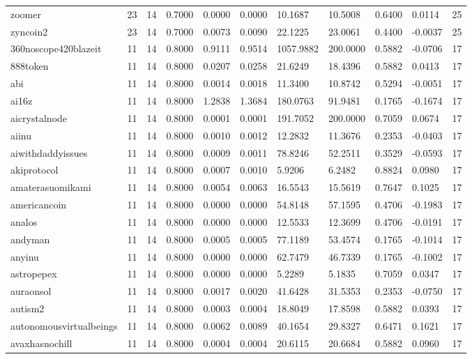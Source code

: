 \begin{table}[htbp]
\begin{tabular}{lllllllllll}
zoomer & 23 & 14 & 0.7000 & 0.0000 & 0.0000 & 10.1687 & 10.5008 & 0.6400 & 0.0114 & 25 \\
zyncoin2 & 23 & 14 & 0.7000 & 0.0073 & 0.0090 & 22.1225 & 23.0061 & 0.4400 & -0.0037 & 25 \\
360noscope420blazeit & 11 & 14 & 0.8000 & 0.9111 & 0.9514 & 1057.9882 & 200.0000 & 0.5882 & -0.0706 & 17 \\
888token & 11 & 14 & 0.8000 & 0.0207 & 0.0258 & 21.6249 & 18.4396 & 0.5882 & 0.0413 & 17 \\
abi & 11 & 14 & 0.8000 & 0.0014 & 0.0018 & 11.3400 & 10.8742 & 0.5294 & -0.0051 & 17 \\
ai16z & 11 & 14 & 0.8000 & 1.2838 & 1.3684 & 180.0763 & 91.9481 & 0.1765 & -0.1674 & 17 \\
aicrystalnode & 11 & 14 & 0.8000 & 0.0001 & 0.0001 & 191.7052 & 200.0000 & 0.7059 & 0.0674 & 17 \\
aiinu & 11 & 14 & 0.8000 & 0.0010 & 0.0012 & 12.2832 & 11.3676 & 0.2353 & -0.0403 & 17 \\
aiwithdaddyissues & 11 & 14 & 0.8000 & 0.0009 & 0.0011 & 78.8246 & 52.2511 & 0.3529 & -0.0593 & 17 \\
akiprotocol & 11 & 14 & 0.8000 & 0.0007 & 0.0010 & 5.9206 & 6.2482 & 0.8824 & 0.0980 & 17 \\
amaterasuomikami & 11 & 14 & 0.8000 & 0.0054 & 0.0063 & 16.5543 & 15.5619 & 0.7647 & 0.1025 & 17 \\
americancoin & 11 & 14 & 0.8000 & 0.0000 & 0.0000 & 54.8148 & 57.1595 & 0.4706 & -0.1983 & 17 \\
analos & 11 & 14 & 0.8000 & 0.0000 & 0.0000 & 12.5533 & 12.3699 & 0.4706 & -0.0191 & 17 \\
andyman & 11 & 14 & 0.8000 & 0.0005 & 0.0005 & 77.1189 & 53.4574 & 0.1765 & -0.1014 & 17 \\
anyinu & 11 & 14 & 0.8000 & 0.0000 & 0.0000 & 62.7479 & 46.7339 & 0.1765 & -0.1002 & 17 \\
astropepex & 11 & 14 & 0.8000 & 0.0000 & 0.0000 & 5.2289 & 5.1835 & 0.7059 & 0.0347 & 17 \\
auraonsol & 11 & 14 & 0.8000 & 0.0017 & 0.0020 & 41.6428 & 31.5353 & 0.2353 & -0.0750 & 17 \\
autism2 & 11 & 14 & 0.8000 & 0.0003 & 0.0004 & 18.8049 & 17.8598 & 0.5882 & 0.0393 & 17 \\
autonomousvirtualbeings & 11 & 14 & 0.8000 & 0.0062 & 0.0089 & 40.1654 & 29.8327 & 0.6471 & 0.1621 & 17 \\
avaxhasnochill & 11 & 14 & 0.8000 & 0.0004 & 0.0004 & 20.6115 & 20.6684 & 0.5882 & 0.0960 & 17 \\

\end{tabular}
\end{table}
